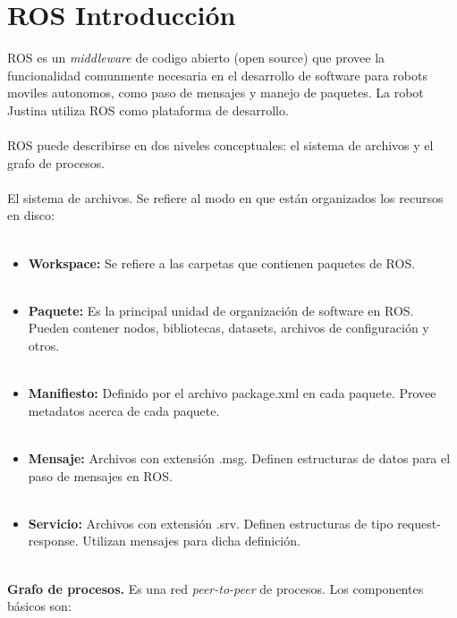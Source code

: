 \documentclass[a4paper]{book}
\begin{document}
\section{ROS Introducción}
ROS es un \textit{middleware} de codigo abierto (open source) que provee la funcionalidad comunmente necesaria en el desarrollo de software para robots moviles autonomos, como paso de mensajes y manejo de paquetes. La robot Justina utiliza ROS como plataforma de desarrollo.\\
\\
ROS puede describirse en dos niveles conceptuales: el sistema de archivos y el grafo de
procesos.\\
\\
El sistema de archivos. Se refiere al modo en que están organizados los recursos en
disco:\\
\\
\begin{itemize}
\item \textbf{Workspace:} Se refiere a las carpetas que contienen paquetes de ROS.\\
\\
\item \textbf{Paquete:} Es la principal unidad de organización de software en ROS. Pueden contener nodos, bibliotecas, datasets, archivos de configuración y otros.\\
\\
\item \textbf{Manifiesto:} Definido por el archivo package.xml en cada paquete. Provee metadatos acerca de cada paquete.\\
\\
\item \textbf{Mensaje:} Archivos con extensión .msg. Definen estructuras de datos para el paso de mensajes en ROS.\\
\\
\item \textbf{Servicio:} Archivos con extensión .srv. Definen estructuras de tipo request-response. Utilizan mensajes para dicha definición.\\
\\
\end{itemize}
\textbf{Grafo de procesos.} Es una red \textit{peer-to-peer} de procesos. Los componentes básicos son:\\
\\
\end{document}
